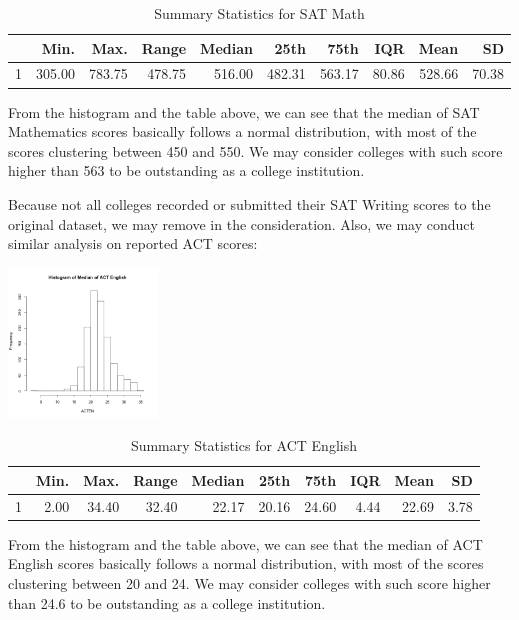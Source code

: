 \documentclass{article}\usepackage[]{graphicx}\usepackage[]{color}
\begin{document}
\begin{table}[ht]
\centering
\begin{tabular}{rrrrrrrrrr}
  \hline
 & Min. & Max. & Range & Median & 25th & 75th & IQR & Mean & SD \\ 
  \hline
1 & 305.00 & 783.75 & 478.75 & 516.00 & 482.31 & 563.17 & 80.86 & 528.66 & 70.38 \\ 
   \hline
\end{tabular}
\caption{Summary Statistics for SAT Math} 
\end{table}


From the histogram and the table above, we can see that the median of SAT Mathematics scores basically follows a normal distribution, with most of the scores clustering between 450 and 550. We may consider colleges with such score higher than 563 to be outstanding as a college institution.

Because not all colleges recorded or submitted their SAT Writing scores to the original dataset, we may remove in the consideration. Also, we may conduct similar analysis on reported ACT scores:



{\centering \includegraphics[width=150px]{../images/histogram-ACTENMedian} 

}


\begin{table}[ht]
\centering
\begin{tabular}{rrrrrrrrrr}
  \hline
 & Min. & Max. & Range & Median & 25th & 75th & IQR & Mean & SD \\ 
  \hline
1 & 2.00 & 34.40 & 32.40 & 22.17 & 20.16 & 24.60 & 4.44 & 22.69 & 3.78 \\ 
   \hline
\end{tabular}
\caption{Summary Statistics for ACT English} 
\end{table}


From the histogram and the table above, we can see that the median of ACT English scores basically follows a normal distribution, with most of the scores clustering between 20 and 24. We may consider colleges with such score higher than 24.6 to be outstanding as a college institution.
\end{document}
